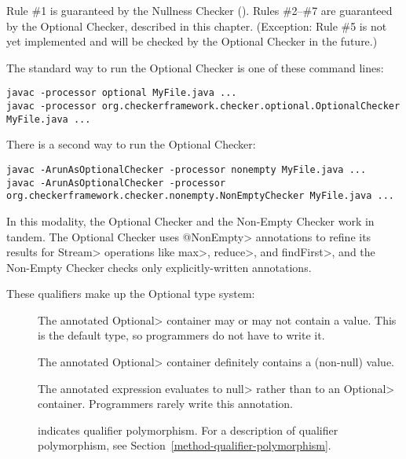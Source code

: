 Rule \#1 is guaranteed by the Nullness Checker
().
Rules \#2--\#7 are guaranteed by the Optional Checker, described in this chapter.
(Exception:  Rule \#5 is not yet implemented and will be checked by the
Optional Checker in the future.)



The standard way to run the Optional Checker is one of these command lines:

\begin{Verbatim}
javac -processor optional MyFile.java ...
javac -processor org.checkerframework.checker.optional.OptionalChecker MyFile.java ...
\end{Verbatim}

There is a second way to run the Optional Checker:

\begin{Verbatim}
javac -ArunAsOptionalChecker -processor nonempty MyFile.java ...
javac -ArunAsOptionalChecker -processor org.checkerframework.checker.nonempty.NonEmptyChecker MyFile.java ...
\end{Verbatim}

In this modality, the Optional Checker and the Non-Empty Checker work in
tandem.  The Optional Checker uses \<@NonEmpty> annotations to refine its
results for \<Stream> operations like \<max>, \<reduce>, and \<findFirst>,
and the Non-Empty Checker checks only explicitly-written annotations.



These qualifiers make up the Optional type system:

\begin{description}

\item[]
  The annotated \<Optional> container may or may not contain a value.
  This is the default type, so programmers do not have to write it.

\item[]
  The annotated \<Optional> container definitely contains a (non-null) value.

\item[]
  The annotated expression evaluates to \<null> rather than to an \<Optional> container.
  Programmers rarely write this annotation.

\item[]
  indicates qualifier polymorphism.
  For a description of qualifier polymorphism, see
  Section~\ref{method-qualifier-polymorphism}.

\end{description}

